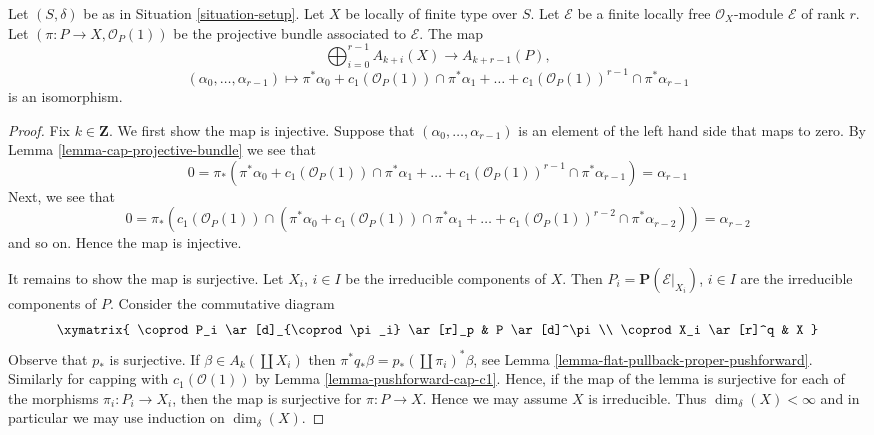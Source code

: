 \begin{lemma}
\label{lemma-chow-ring-projective-bundle}
Let $(S, \delta)$ be as in Situation \ref{situation-setup}.
Let $X$ be locally of finite type over $S$.
Let $\mathcal{E}$ be a finite locally free $\mathcal{O}_X$-module
$\mathcal{E}$ of rank $r$. Let $(\pi : P \to X, \mathcal{O}_P(1))$
be the projective bundle associated to $\mathcal{E}$.
The map
$$
\bigoplus\nolimits_{i = 0}^{r - 1}
A_{k + i}(X)
\longrightarrow
A_{k + r - 1}(P),
$$
$$
(\alpha_0, \ldots, \alpha_{r-1})
\longmapsto
\pi^*\alpha_0 +
c_1(\mathcal{O}_P(1)) \cap \pi^*\alpha_1
+ \ldots +
c_1(\mathcal{O}_P(1))^{r - 1} \cap \pi^*\alpha_{r-1}
$$
is an isomorphism.
\end{lemma}

\begin{proof}
Fix $k \in \mathbf{Z}$. We first show the map is injective.
Suppose that $(\alpha_0, \ldots, \alpha_{r - 1})$ is an element
of the left hand side that maps to zero.
By Lemma \ref{lemma-cap-projective-bundle} we see that
$$
0 = \pi_*(\pi^*\alpha_0 +
c_1(\mathcal{O}_P(1)) \cap \pi^*\alpha_1
+ \ldots +
c_1(\mathcal{O}_P(1))^{r - 1} \cap \pi^*\alpha_{r-1})
= \alpha_{r - 1}
$$
Next, we see that
$$
0 = \pi_*(c_1(\mathcal{O}_P(1)) \cap (\pi^*\alpha_0 +
c_1(\mathcal{O}_P(1)) \cap \pi^*\alpha_1
+ \ldots +
c_1(\mathcal{O}_P(1))^{r - 2} \cap \pi^*\alpha_{r - 2}))
= \alpha_{r - 2}
$$
and so on. Hence the map is injective.

\medskip\noindent
It remains to show the map is surjective.
Let $X_i$, $i \in I$ be the irreducible components of $X$.
Then $P_i = \mathbf{P}(\mathcal{E}|_{X_i})$, $i \in I$
are the irreducible components of $P$. Consider the commutative
diagram
$$
\xymatrix{
\coprod P_i \ar[d]_{\coprod \pi_i} \ar[r]_p & P \ar[d]^\pi \\
\coprod X_i \ar[r]^q & X
}
$$
Observe that $p_*$ is surjective. If $\beta \in A_k(\coprod X_i)$
then $\pi^* q_* \beta = p_*(\coprod \pi_i)^* \beta$, see
Lemma \ref{lemma-flat-pullback-proper-pushforward}. Similarly for
capping with $c_1(\mathcal{O}(1))$ by
Lemma \ref{lemma-pushforward-cap-c1}.
Hence, if the map of the lemma is surjective for each
of the morphisms $\pi_i : P_i \to X_i$, then the map is
surjective for $\pi : P \to X$. Hence we may assume $X$ is irreducible.
Thus $\dim_\delta(X) < \infty$ and in particular we may use
induction on $\dim_\delta(X)$.


\end{proof}
